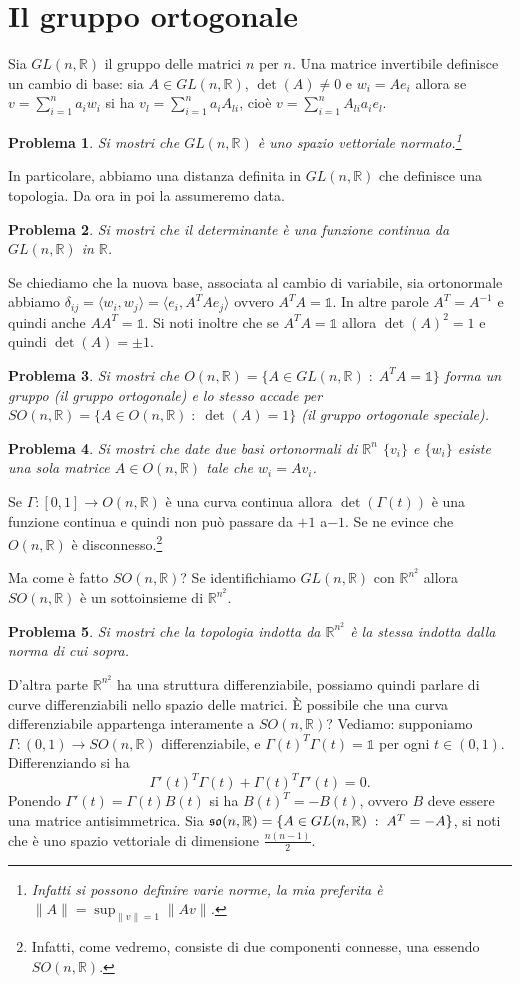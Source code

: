 \documentclass{amsart}
\numberwithin{equation}{section}
\newtheorem{pro}{Problema}
\newcommand\bR{{\mathbb R}}
\newcommand\Id{{\mathds{1}}}
\newcommand{\lie}{\frak s\frak o}
\begin{document}
\section{Il gruppo ortogonale}
Sia $GL(n,\bR)$ il gruppo delle matrici $n$ per $n$. Una matrice invertibile definisce un  cambio di base: sia $A\in GL(n,\bR)$, $\det(A)\neq 0$ e $w_i=Ae_i$ allora se $v=\sum_{i=1}^n a_i w_i$ si ha $v_l=\sum_{i=1}^n a_i A_{li}$, cio\`e $v=\sum_{i=1}^n A_{li} a_ie_l$.
\begin{pro} Si mostri che $GL(n,\bR)$ \`e uno spazio vettoriale normato.\footnote{ Infatti si possono definire varie norme, la mia preferita \`e $\|A\|=\sup_{\|v\|=1}\|Av\|$.}
\end{pro}
In particolare, abbiamo una distanza definita in $GL(n,\bR)$ che definisce una topologia. Da ora in poi la assumeremo data.
\begin{pro} Si mostri che il determinante \`e una funzione continua da $GL(n,\bR)$ in $\bR$.
\end{pro}
Se chiediamo che la nuova base, associata al cambio di variabile, sia ortonormale abbiamo $\delta_{ij}=\langle w_i,w_j\rangle=\langle e_i, A^TAe_j\rangle$ ovvero $A^TA=\Id$.  In altre parole $A^T=A^{-1}$  e quindi anche $AA^T=\Id$. Si noti inoltre che se $A^TA=\Id$ allora $\det(A)^2=1$ e quindi $\det(A)=\pm1$.
\begin{pro} Si mostri che $O(n,\bR)=\{A\in GL(n,\bR)\;:\; A^TA=\Id\}$ forma un gruppo (il gruppo ortogonale) e lo stesso accade per $SO(n,\bR)=\{A\in O(n,\bR)\;:\;\det(A)=1\}$ (il gruppo ortogonale speciale).
\end{pro}

\begin{pro} Si mostri che date due basi ortonormali di $\bR^n$ $\{v_i\}$ e $\{w_i\}$ esiste una sola matrice $A\in O(n,\bR)$ tale che $w_i=Av_i$.
\end{pro}
Se $\Gamma:[0,1]\to O(n,\bR)$ \`e una curva continua allora $\det(\Gamma(t))$ \`e una funzione continua e quindi non pu\`o passare da $+1$  a$-1$. Se ne evince che $O(n,\bR)$ \`e disconnesso.\footnote{ Infatti, come vedremo, consiste di due componenti connesse, una essendo $SO(n,\bR)$.}

Ma come \`e fatto $SO(n,\bR)$? Se identifichiamo $GL(n,\bR)$ con $\bR^{n^2}$ allora $SO(n,\bR)$ \`e un sottoinsieme di $\bR^{n^2}$.
\begin{pro} Si mostri che la topologia indotta da $\bR^{n^2}$ \`e la stessa indotta dalla norma di cui sopra.
\end{pro}
D'altra parte $\bR^{n^2}$ ha una struttura differenziabile, possiamo quindi parlare di curve differenziabili nello spazio delle matrici. \`E possibile che una curva differenziabile appartenga interamente a $SO(n,\bR)$? Vediamo: supponiamo $\Gamma:(0,1)\to SO(n,\bR)$ differenziabile, e $\Gamma(t)^T\Gamma(t)=\Id$ per ogni $t\in (0,1)$. Differenziando si ha
\[
\Gamma'(t)^T\Gamma(t)+\Gamma(t)^T\Gamma'(t)=0.
\]
Ponendo $\Gamma'(t)=\Gamma(t)B(t)$ si ha $B(t)^T=-B(t)$, ovvero $B$ deve essere una matrice antisimmetrica. Sia $\lie(n,\bR)=\{A\in GL(n,\bR)\;:\; A^T=-A\}$, si noti che \`e uno spazio vettoriale di dimensione $\frac{n(n-1)}2$.
\end{document}
